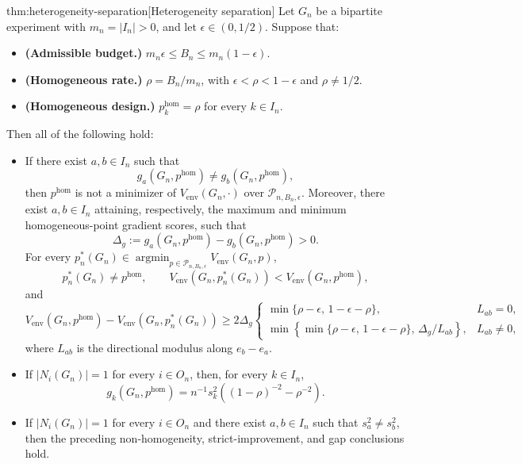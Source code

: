 \documentclass[11pt]{article}
\begin{document}
\begin{theoremv}{thm:heterogeneity-separation}[Heterogeneity separation]
Let \(G_n\) be a bipartite experiment with \(m_n=|I_n|>0\), and let \(\epsilon\in(0,1/2)\). Suppose that:
\begin{itemize}
\item \textbf{(Admissible budget.)} \(m_n\epsilon\le B_n\le m_n(1-\epsilon)\).
\item \textbf{(Homogeneous rate.)} \(\rho=B_n/m_n\), with \(\epsilon<\rho<1-\epsilon\) and \(\rho\neq 1/2\).
\item \textbf{(Homogeneous design.)} \(p^{\mathrm{hom}}_k=\rho\) for every \(k\in I_n\).
\end{itemize}
Then all of the following hold:
\begin{itemize}
\item If there exist \(a,b\in I_n\) such that
\[
g_a(G_n,p^{\mathrm{hom}})\neq g_b(G_n,p^{\mathrm{hom}}),
\]
then \(p^{\mathrm{hom}}\) is not a minimizer of \(V_{\mathrm{env}}(G_n,\cdot)\) over \(\mathcal P_{n,B_n,\epsilon}\). Moreover, there exist \(a,b\in I_n\) attaining, respectively, the maximum and minimum homogeneous-point gradient scores, such that
\[
\Delta_g:=g_a(G_n,p^{\mathrm{hom}})-g_b(G_n,p^{\mathrm{hom}})>0.
\]
For every \(p_n^*(G_n)\in\operatorname{argmin}_{p\in\mathcal P_{n,B_n,\epsilon}}V_{\mathrm{env}}(G_n,p)\),
\[
p_n^*(G_n)\neq p^{\mathrm{hom}},\qquad
V_{\mathrm{env}}(G_n,p_n^*(G_n))<V_{\mathrm{env}}(G_n,p^{\mathrm{hom}}),
\]
and
\[
V_{\mathrm{env}}(G_n,p^{\mathrm{hom}})-V_{\mathrm{env}}(G_n,p_n^*(G_n))
\ge
2\Delta_g
\begin{cases}
\min\{\rho-\epsilon,\,1-\epsilon-\rho\}, & L_{ab}=0,\\
\min\!\left\{\min\{\rho-\epsilon,\,1-\epsilon-\rho\},\,\Delta_g/L_{ab}\right\}, & L_{ab}\neq0,
\end{cases}
\]
where \(L_{ab}\) is the directional modulus along \(e_b-e_a\).

\item If \(|N_i(G_n)|=1\) for every \(i\in O_n\), then, for every \(k\in I_n\),
\[
g_k(G_n,p^{\mathrm{hom}})
=
n^{-1}s_k^2\left((1-\rho)^{-2}-\rho^{-2}\right).
\]

\item If \(|N_i(G_n)|=1\) for every \(i\in O_n\) and there exist \(a,b\in I_n\) such that \(s_a^2\neq s_b^2\), then the preceding non-homogeneity, strict-improvement, and gap conclusions hold.
\end{itemize}
\end{theoremv}
\end{document}
